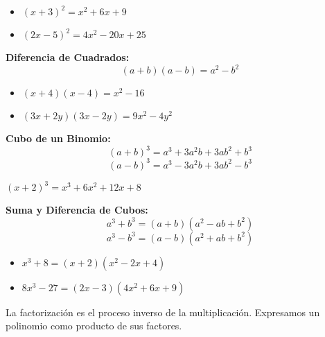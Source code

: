 \begin{example}
\begin{itemize}
\item $(x + 3)^2 = x^2 + 6x + 9$
\item $(2x - 5)^2 = 4x^2 - 20x + 25$
\end{itemize}
\end{example}

\begin{theorem}
\textbf{Diferencia de Cuadrados:}
$$(a + b)(a - b) = a^2 - b^2$$
\end{theorem}

\begin{example}
\begin{itemize}
\item $(x + 4)(x - 4) = x^2 - 16$
\item $(3x + 2y)(3x - 2y) = 9x^2 - 4y^2$
\end{itemize}
\end{example}

\begin{theorem}
\textbf{Cubo de un Binomio:}
$$(a + b)^3 = a^3 + 3a^2b + 3ab^2 + b^3$$
$$(a - b)^3 = a^3 - 3a^2b + 3ab^2 - b^3$$
\end{theorem}

\begin{example}
$(x + 2)^3 = x^3 + 6x^2 + 12x + 8$
\end{example}

\begin{theorem}
\textbf{Suma y Diferencia de Cubos:}
$$a^3 + b^3 = (a + b)(a^2 - ab + b^2)$$
$$a^3 - b^3 = (a - b)(a^2 + ab + b^2)$$
\end{theorem}

\begin{example}
\begin{itemize}
\item $x^3 + 8 = (x + 2)(x^2 - 2x + 4)$
\item $8x^3 - 27 = (2x - 3)(4x^2 + 6x + 9)$
\end{itemize}
\end{example}


La factorización es el proceso inverso de la multiplicación. Expresamos un polinomio como producto de sus factores.

